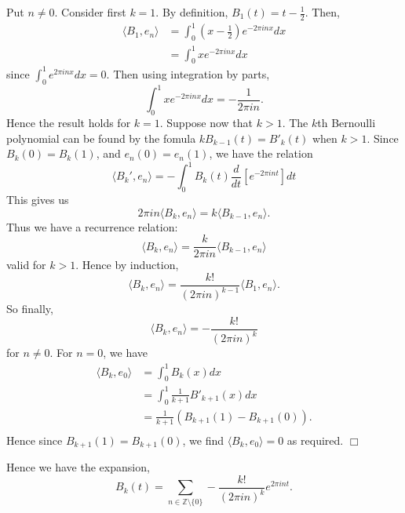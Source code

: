 \documentclass[10pt]{article}
\newenvironment{proof}[1][Proof]{\begin{trivlist}
\item[\hskip \labelsep {\bfseries #1}]}{\end{trivlist}}
\begin{document}
    \begin{proof}
        Put $n\neq 0$. Consider first $k = 1$. By definition,
        $B_1(t) = t-\frac{1}{2}$. Then,
        \begin{align*}
            \langle B_1,e_n \rangle &= \int_{0}^1\! (x-\frac{1}{2})e^{-2\pi inx}dx\\
            &= \int_0^1\!xe^{-2\pi i nx}dx
        \end{align*}
        since $\int_0^1e^{2\pi inx}dx = 0$. Then using integration by parts,
        \begin{equation*}
            \int_{0}^1\!xe^{-2\pi inx}dx = -\frac{1}{2\pi i n}.
        \end{equation*}
        Hence the result holds for $k = 1$. Suppose now that $k > 1$.       
        The $k$th Bernoulli polynomial can be found by the fomula $kB_{k-1}(t) = B'_k(t)$
        when $k > 1$.
        Since $B_k(0) = B_k(1)$, and $e_n(0) = e_n(1)$, we have the relation
        \begin{equation*}
            \langle B_k',e_n\rangle = -\int_{0}^1 B_k(t)\frac{d}{dt}[e^{-2\pi i n t}]dt
        \end{equation*}
        This gives us
        \begin{equation*}
            2\pi i n\langle B_k,e_n\rangle = k\langle B_{k-1},e_n\rangle.
        \end{equation*}
        Thus we have a recurrence relation:
        \begin{equation*}
            \langle B_k,e_n\rangle = \frac{k}{2\pi i n}\langle B_{k-1},e_n\rangle
        \end{equation*}
        valid for $k > 1$. Hence by induction,
        \begin{equation*}
            \langle B_k,e_n\rangle = \frac{k!}{(2\pi in)^{k-1}}\langle B_1,e_n\rangle.
        \end{equation*}
        So finally,
        \begin{equation*}
            \langle B_k,e_n \rangle = -\frac{k!}{(2\pi in)^k}
        \end{equation*}
        for $n\neq 0$.        
        For $n = 0$, we have
        \begin{align*}
            \langle B_k,e_0\rangle &= \int_0^1\!B_k(x)dx\\
            &= \int_0^1\frac{1}{k+1}B'_{k+1}(x)dx\\
            &= \frac{1}{k+1}(B_{k+1}(1)-B_{k+1}(0)).\\
        \end{align*} 
        Hence since $B_{k+1}(1) = B_{k+1}(0)$, we find $\langle B_k, e_0\rangle = 0$ as required.
        $\Box$
    \end{proof} 
    Hence we have the expansion,
    \begin{equation*}
        B_k(t) = \sum_{n\in \mathbb{Z}\setminus\{0\}} -\frac{k!}{(2\pi i n)^k}e^{2\pi i nt}.
    \end{equation*}
    
\end{document}
